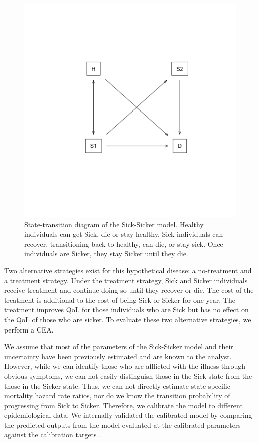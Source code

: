 \documentclass[]{book}
\begin{document}
\begin{figure}

{\centering \includegraphics[width=6.67in]{../figs/02_model_diagram} 

}

\caption{State-transition diagram of the Sick-Sicker model. Healthy individuals can get Sick, die or stay healthy. Sick individuals can recover, transitioning back to healthy, can die, or stay sick. Once individuals are Sicker, they stay Sicker until they die.}\label{fig:STM-Sick-Sicker}
\end{figure}

Two alternative strategies exist for this hypothetical disease: a no-treatment and a treatment strategy. Under the treatment strategy, Sick and Sicker individuals receive treatment and continue doing so until they recover or die. The cost of the treatment is additional to the cost of being Sick or Sicker for one year. The treatment improves QoL for those individuals who are Sick but has no effect on the QoL of those who are sicker. To evaluate these two alternative strategies, we perform a CEA.

We assume that most of the parameters of the Sick-Sicker model and their uncertainty have been previously estimated and are known to the analyst. However, while we can identify those who are afflicted with the illness through obvious symptoms, we can not easily distinguish those in the Sick state from the those in the Sicker state. Thus, we can not directly estimate state-specific mortality hazard rate ratios, nor do we know the transition probability of progressing from Sick to Sicker. Therefore, we calibrate the model to different epidemiological data. We internally validated the calibrated model by comparing the predicted outputs from the model evaluated at the calibrated parameters against the calibration targets \citep[\citet{Goldhaber_Fiebert2010}]{Eddy2012}.
\end{document}
